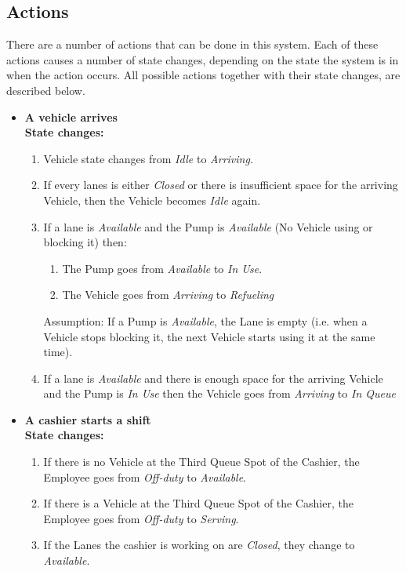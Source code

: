 \subsection{Actions}
There are a number of actions that can be done in this system. Each of these actions causes a number of state changes, depending on the state the system is in when the action occurs. All possible actions together with their state changes, are described below.
\begin{itemize}
\item \textbf{A vehicle arrives}\\
\textbf{State changes:}
\begin{enumerate}
\item Vehicle state changes from \textit{Idle} to \textit{Arriving}.
\item If every lanes is either \textit{Closed} or there is insufficient space for the arriving Vehicle, then the Vehicle becomes \textit{Idle} again.
\item If a lane is \textit{Available} and the Pump is \textit{Available} (No Vehicle using or blocking it) then:
\begin{enumerate}
\item The Pump goes from \textit{Available} to \textit{In Use}.
\item The Vehicle goes from \textit{Arriving} to \textit{Refueling}
\end{enumerate}
Assumption: If a Pump is \textit{Available}, the Lane is empty (i.e. when a Vehicle stops blocking it, the next Vehicle starts using it at the same time).
\item If a lane is \textit{Available} and there is enough space for the arriving Vehicle and the Pump is \textit{In Use} then the Vehicle goes from \textit{Arriving} to \textit{In Queue}
\end{enumerate}
\item \textbf{A cashier starts a shift}\\
\textbf{State changes:}
\begin{enumerate}
\item If there is no Vehicle at the Third Queue Spot of the Cashier, the Employee goes from \textit{Off-duty} to \textit{Available}.
\item If there is a Vehicle at the Third Queue Spot of the Cashier, the Employee goes from \textit{Off-duty} to \textit{Serving}.
\item If the Lanes the cashier is working on are \textit{Closed}, they change to \textit{Available}.
\end{enumerate}

\end{itemize}
